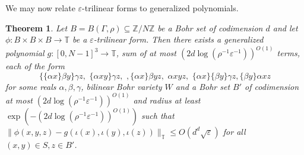 \documentclass[a4paper,11pt]{article}
\newtheorem{theorem}{Theorem}
\numberwithin{theorem}{section}
\theoremstyle{definition}
\begin{document}
We may now relate $\varepsilon$-trilinear forms to generalized polynomials.

\begin{theorem}\label{almosttrilineartogenpolys}
    Let $B = B(\Gamma, \rho) \subseteq \mathbb{Z}/N\mathbb{Z}$ be a Bohr set of codimension $d$ and let $\phi : B \times B \times B \to \mathbb{T}$ be a $\varepsilon$-trilinear form. Then there exists a generalized polynomial $g : [0, N-1]^3 \to \mathbb{T}$, sum of at most $ (2d\log(\rho^{-1}\varepsilon^{-1}))^{O(1)}$ terms, each of the form 
    \[\{\{\alpha x\}\beta y\} \gamma z,\,\,\{\alpha x y\} \gamma z,\,\,,\{\alpha x\}\beta yz,\,\,\alpha xyz,\,\,\{\alpha x\}\{\beta y\} \gamma z, \{\beta y\} \alpha xz\]
    for some reals $\alpha, \beta, \gamma$, bilinear Bohr variety $W$ and a Bohr set $B'$ of codimension at most $(2d\log(\rho^{-1}\varepsilon^{-1}))^{O(1)}$ and radius at least $\exp(-(2d\log(\rho^{-1}\varepsilon^{-1}))^{O(1)})$ such that $\|\phi(x, y, z) - g(\iota(x),\iota(y),\iota(z)) \|_{\mathbb{T}} \leq O(d^d \sqrt{\varepsilon})$ for all $(x,y) \in S,z \in B'$.
\end{theorem}
\end{document}

